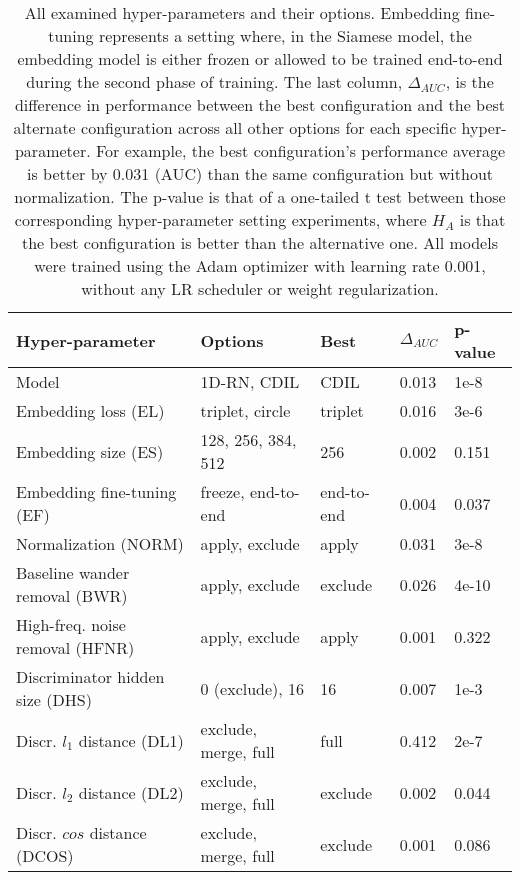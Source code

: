 \documentclass[preprint,12pt]{elsarticle}
\begin{document}
\begin{landscape}

\begin{table}
    \centering
    \begin{tabular}{lllll}
        \toprule
        \textbf{Hyper-parameter} & \textbf{Options} & \textbf{Best} & \textbf{$\Delta_{AUC}$} & \textbf{p-value}\\
        \midrule
        Model & 1D-RN, CDIL & CDIL & 0.013 & 1e-8 \\ 
        Embedding loss (EL) & triplet, circle & triplet & 0.016 & 3e-6 \\
        Embedding size (ES) & 128, 256, 384, 512 & 256 & 0.002 & 0.151 \\ 
        Embedding fine-tuning (EF) & freeze, end-to-end & end-to-end & 0.004 & 0.037 \\
        Normalization (NORM) & apply, exclude & apply & 0.031 & 3e-8\\ 
        Baseline wander removal (BWR) & apply, exclude & exclude & 0.026 & 4e-10\\
        High-freq. noise removal (HFNR) & apply, exclude & apply & 0.001 & 0.322\\
        \midrule
        Discriminator hidden size (DHS) & 0 (exclude), 16 & 16 & 0.007 & 1e-3\\
        Discr. $l_1$ distance (DL1) & exclude, merge, full & full & 0.412 & 2e-7\\
        Discr. $l_2$ distance (DL2) & exclude, merge, full & exclude & 0.002 & 0.044 \\
        Discr. $cos$ distance (DCOS) & exclude, merge, full & exclude & 0.001 & 0.086 \\
        \bottomrule
    \end{tabular}
    \caption{All examined hyper-parameters and their options. Embedding fine-tuning represents a setting where, in the Siamese model, the embedding model is either frozen or allowed to be trained end-to-end during the second phase of training. The last column, $\Delta_{AUC}$, is the difference in performance between the best configuration and the best alternate configuration across all other options for each specific hyper-parameter. For example, the best configuration's performance average is better by 0.031 (AUC) than the same configuration but without normalization. The p-value is that of a one-tailed t test between those corresponding hyper-parameter setting experiments, where $H_A$ is that the best configuration is better than the alternative one. All models were trained using the Adam optimizer with learning rate 0.001, without any LR scheduler or weight regularization.}
    \label{tab:hpsearch-1}
\end{table}

\end{landscape}
\end{document}
